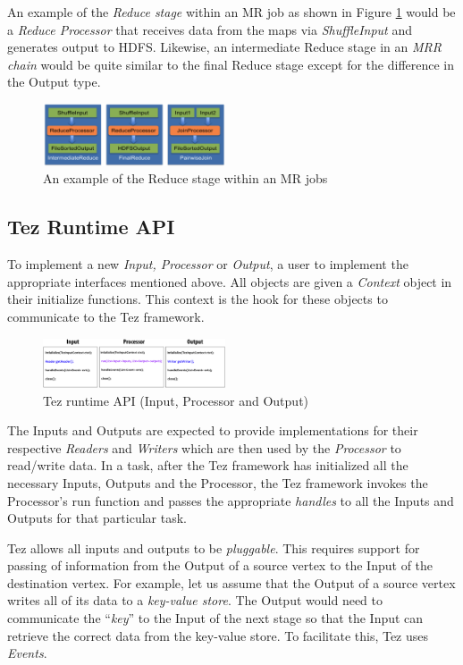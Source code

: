 \documentclass[twocolumn]{article}
\begin{document}
An example of the \emph{Reduce stage} within an MR job as shown in Figure \ref{fig10} would be a
\emph{Reduce Processor} that receives data from the maps via
\emph{ShuffleInput} and generates output to HDFS. Likewise, an
intermediate Reduce stage in an \emph{MRR chain} would be quite
similar to the final Reduce stage except for the difference in the
Output type.

\begin{figure}[htb]
        \centering
        \includegraphics[width=0.48\textwidth]{tez12}
        \caption{An example of the Reduce stage within an MR jobs}
        \label{fig10}
\end{figure}


\subsection{Tez Runtime API}

To implement a new \textit{Input, Processor} or \textit{Output}, a user to implement the
appropriate interfaces mentioned above. All objects are given a \textit{Context}
object in their initialize functions. This context is the hook for these
objects to communicate to the Tez framework. 

\begin{figure}[htb]
        \centering
        \includegraphics[width=0.48\textwidth]{tez32}
        \caption{Tez runtime API (Input, Processor and Output)}
        \label{fig11}
\end{figure}

The Inputs and Outputs are expected to provide implementations for their respective
\textit{Readers} and \textit{Writers} which are then used by the \textit{Processor} to read/write
data. In a task, after the Tez framework has initialized all the
necessary Inputs, Outputs and the Processor, the Tez framework invokes
the Processor's run function and passes the appropriate \textit{handles} to all
the Inputs and Outputs for that particular task.

Tez allows all inputs and outputs to be \emph{pluggable}. This requires
support for passing of information from the Output of a source vertex to
the Input of the destination vertex. For example, let us assume that the
Output of a source vertex writes all of its data to a \emph{key-value
store}. The Output would need to communicate the ``\emph{key}'' to the
Input of the next stage so that the Input can retrieve the correct data
from the key-value store. To facilitate this, Tez uses \emph{Events}.
\end{document}
